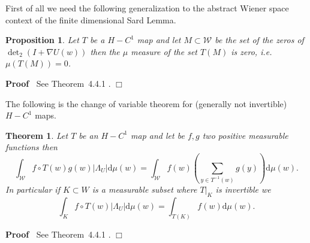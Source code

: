 \documentclass[a4paper,10pt]{article}
\newcommand{\mathd}{\mathrm{d}}
\newcommand{\nobracket}{}
\newenvironment{proof}{\noindent\textbf{Proof\ }}{\hspace*{\fill}$\Box$\medskip}
\newtheorem{proposition}{Proposition}
{\theorembodyfont{\rmfamily}\newtheorem{remark}{Remark}}
\newtheorem{theorem}{Theorem}
\begin{document}
First of all we need the following generalization to the abstract Wiener
space context of the finite dimensional Sard Lemma.

\begin{proposition}
  \label{proposition_Sard}Let $T$ be a $H - C^1$ map and let $M \subset
  \mathcal{W}$ be the set of the zeros of $\det\nolimits_2 (I + \nabla U (w))$ then the
  $\mu$ measure of the set $T (M)$ is zero, i.e. $\mu (T (M)) = 0$.
\end{proposition}

\begin{proof}
  See Theorem~4.4.1 {\cite{Ustunel2000}}.
\end{proof}

The following is the change of variable theorem for (generally not invertible)
$H - C^1$ maps. \

\begin{theorem}
  \label{theorem_Lambda}Let $T$ be an $H - C^1$ map and let be $f, g$ two
  positive measurable functions then
  \begin{equation}
    \int_{\mathcal{W}} f \circ T (w) g (w) | \Lambda_U | \mathd \mu (w) =
    \int_{\mathcal{W}} f (w) \left( \sum_{y \in T^{- 1} (w)} g (y) \right)
    \mathd \mu (w) . \label{equationwienerspace4}
  \end{equation}
  In particular if $K \subset W$ is a measurable subset where $\nobracket T
  |_K$ is invertible we
  \[ \int_K f \circ T (w) | \Lambda_U | \mathd \mu (w) = \int_{T (K)} f (w)
     \mathd \mu (w) . \]
\end{theorem}

\begin{proof}
  See Theorem~4.4.1 {\cite{Ustunel2000}}.
\end{proof}
\end{document}
